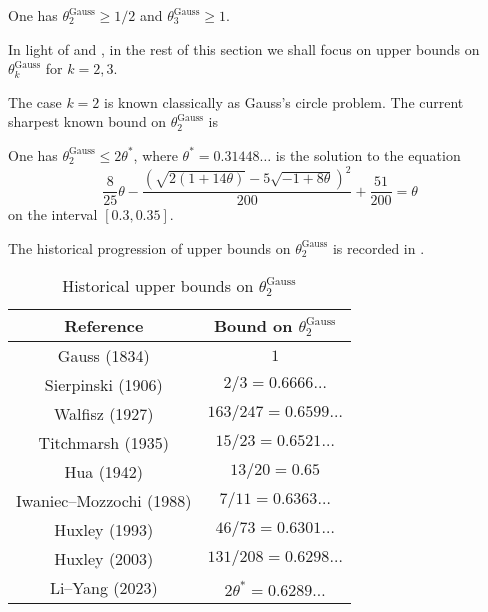 \begin{theorem}\label{gauss-circle-lower-23}
One has $\theta^{\operatorname{Gauss}}_{2} \ge 1/2$ and $\theta^{\operatorname{Gauss}}_{3} \ge 1$.
\end{theorem}

In light of  and , in the rest of this section we shall focus on upper bounds on $\theta^{\operatorname{Gauss}}_{k}$ for $k = 2, 3$.

The case $k = 2$ is known classically as Gauss's circle problem. The current sharpest known bound on $\theta_2^{\operatorname{Gauss}}$ is
\begin{theorem} 
One has $\theta_2^{\operatorname{Gauss}} \le 2\theta^*$, where $\theta^* = 0.31448\ldots$ is the solution to the equation
\[
\frac{8}{25}\theta - \frac{(\sqrt{2(1+14\theta)} - 5\sqrt{-1+8\theta})^2}{200} + \frac{51}{200} = \theta
\]
on the interval $[0.3, 0.35]$.
\end{theorem}

The historical progression of upper bounds on $\theta_2^{\operatorname{Gauss}}$ is recorded in .


\begin{table}[ht]
    \def\arraystretch{1.2}
    \centering
    \caption{Historical upper bounds on $\theta_2^{\operatorname{Gauss}}$}
    \begin{tabular}{|c|c|}
    \hline
    Reference & Bound on $\theta_2^{\operatorname{Gauss}}$\\
    \hline
    Gauss (1834) & $1$\\
    \hline
    Sierpinski (1906) \cite{} & $2/3 = 0.6666\ldots$\\
    \hline
    Walfisz (1927) \cite{} & $163/247 = 0.6599\ldots$\\
    \hline
    Titchmarsh (1935) \cite{} & $15/23 = 0.6521\ldots$\\
    \hline
    Hua (1942) \cite{} & $13/20 = 0.65$\\
    \hline
    Iwaniec--Mozzochi (1988) \cite{iwaniec_divisor_1988} & $7/11 = 0.6363\ldots$ \\
    \hline
    Huxley (1993) \cite{huxley_exponential_1993} & $46/73 = 0.6301\ldots$\\
    \hline
    Huxley (2003) \cite{huxley_exponential_2003} & $131/208 = 0.6298\ldots$\\
    \hline
    Li--Yang (2023) \cite{li_yang_gauss_2024} & $2\theta^* = 0.6289\ldots$\\
    \hline 
    \end{tabular}
\label{gauss-circle-table-2}
\end{table}
